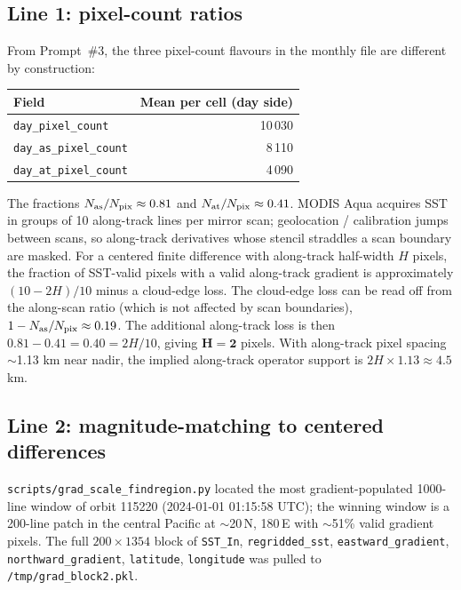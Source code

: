 \documentclass[11pt]{article}
\begin{document}
\subsection{Line 1: pixel-count ratios}\label{sec:line1}

From Prompt~\#3, the three pixel-count flavours in the monthly
file are different by construction:
\begin{center}
\begin{tabular}{@{}lr@{}}
\toprule
Field & Mean per cell (day side) \\
\midrule
\texttt{day\_pixel\_count}     & 10\,030 \\
\texttt{day\_as\_pixel\_count} & ~8\,110 \\
\texttt{day\_at\_pixel\_count} & ~4\,090 \\
\bottomrule
\end{tabular}
\end{center}
The fractions
$N_{\rm as}/N_{\rm pix} \approx 0.81$ and
$N_{\rm at}/N_{\rm pix} \approx 0.41$. MODIS Aqua acquires SST in
groups of 10 along-track lines per mirror scan; geolocation /
calibration jumps between scans, so along-track derivatives whose
stencil straddles a scan boundary are masked. For a centered
finite difference with along-track half-width $H$ pixels, the
fraction of SST-valid pixels with a valid along-track gradient is
approximately $(10-2H)/10$ minus a cloud-edge loss.
The cloud-edge loss can be read off from the along-scan ratio
(which is not affected by scan boundaries),
$1 - N_{\rm as}/N_{\rm pix} \approx 0.19$. The additional
along-track loss is then $0.81 - 0.41 = 0.40 = 2H/10$, giving
$\mathbf{H = 2}$ pixels. With along-track pixel spacing
$\sim$1.13 km near nadir, the implied along-track operator support
is $2H \times 1.13 \approx \mathbf{4.5}$ km.

\subsection{Line 2: magnitude-matching to centered differences}\label{sec:line2}

\texttt{scripts/grad\_scale\_findregion.py} located the most
gradient-populated 1000-line window of orbit 115220
(2024-01-01 01:15:58 UTC); the winning window is a 200-line
patch in the central Pacific at $\sim$20\,N, 180\,E with
$\sim$51\% valid gradient pixels. The full $200\times 1354$
block of \texttt{SST\_In}, \texttt{regridded\_sst},
\texttt{eastward\_gradient},
\texttt{northward\_gradient},
\texttt{latitude}, \texttt{longitude} was pulled to
\texttt{/tmp/grad\_block2.pkl}.
\end{document}
